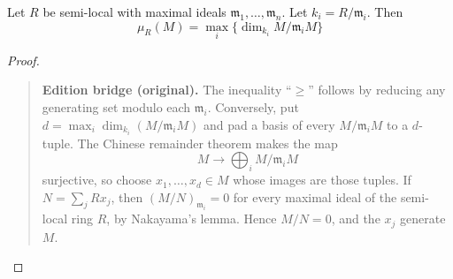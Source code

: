  \begin{theorem}
Let $R$ be semi-local with maximal ideals $\mathfrak{m}_1,\dots,
\mathfrak{m}_n$. Let $k_i = R/\mathfrak{m}_i$. Then
   \[
     \mu_R(M) = \max_i \{\dim_{k_i} M/\mathfrak{m}_i M\}
   \]
 \end{theorem}
\begin{proof} 
\begin{quote}\small\textbf{Edition bridge (original).}
The inequality ``$\geq$'' follows by reducing any generating set modulo each
$\mathfrak m_i$.  Conversely, put $d=\max_i\dim_{k_i}(M/\mathfrak m_iM)$
and pad a basis of every $M/\mathfrak m_iM$ to a $d$-tuple.  The Chinese
remainder theorem makes the map
\[
  M\longrightarrow\bigoplus_i M/\mathfrak m_iM
\]
surjective, so choose $x_1,\ldots,x_d\in M$ whose images are those tuples.
If $N=\sum_jRx_j$, then $(M/N)_{\mathfrak m_i}=0$ for every maximal ideal of
the semi-local ring $R$, by Nakayama's lemma.  Hence $M/N=0$, and the $x_j$
generate $M$.\end{quote}
\end{proof} 

